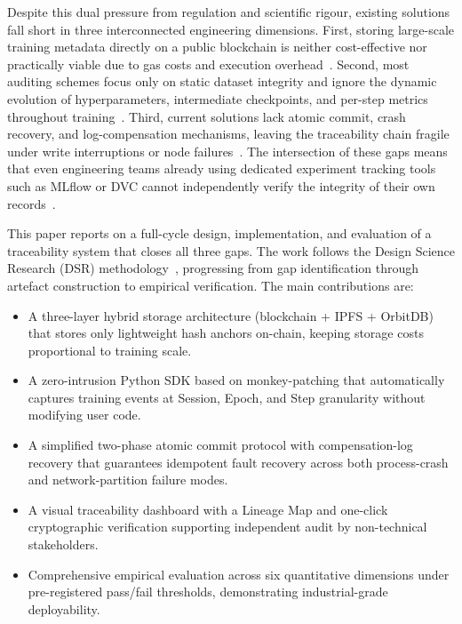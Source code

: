 \documentclass[10pt,twocolumn]{article}
\begin{document}
Despite this dual pressure from regulation and scientific rigour, existing solutions fall
short in three interconnected engineering dimensions. First, storing large-scale training
metadata directly on a public blockchain is neither cost-effective nor practically viable due
to gas costs and execution overhead~\cite{kurada2023}. Second, most auditing schemes focus
only on static dataset integrity and ignore the dynamic evolution of hyperparameters,
intermediate checkpoints, and per-step metrics throughout training~\cite{sciammarelli2026}.
Third, current solutions lack atomic commit, crash recovery, and log-compensation
mechanisms, leaving the traceability chain fragile under write interruptions or node
failures~\cite{belchior2022}. The intersection of these gaps means that even engineering
teams already using dedicated experiment tracking tools such as MLflow or DVC cannot
independently verify the integrity of their own records~\cite{idowu2024}.

This paper reports on a full-cycle design, implementation, and evaluation of a traceability
system that closes all three gaps. The work follows the Design Science Research (DSR)
methodology~\cite{hevner2004}, progressing from gap identification through artefact
construction to empirical verification. The main contributions are:
\begin{itemize}[leftmargin=*, nosep]
  \item A three-layer hybrid storage architecture (blockchain + IPFS + OrbitDB) that stores
        only lightweight hash anchors on-chain, keeping storage costs proportional to
        training scale.
  \item A zero-intrusion Python SDK based on monkey-patching that automatically captures
        training events at Session, Epoch, and Step granularity without modifying user code.
  \item A simplified two-phase atomic commit protocol with compensation-log recovery that
        guarantees idempotent fault recovery across both process-crash and network-partition
        failure modes.
  \item A visual traceability dashboard with a Lineage Map and one-click cryptographic
        verification supporting independent audit by non-technical stakeholders.
  \item Comprehensive empirical evaluation across six quantitative dimensions under
        pre-registered pass/fail thresholds, demonstrating industrial-grade deployability.
\end{itemize}
\end{document}
